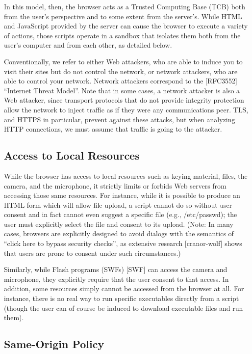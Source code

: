 \documentclass{article}
\begin{document}
In this model, then, the browser acts as a Trusted Computing Base
(TCB) both from the user's perspective and to some extent from the
server's.  While HTML and JavaScript provided by the server can cause
the browser to execute a variety of actions, those scripts operate in
a sandbox that isolates them both from the user's computer and from
each other, as detailed below.

Conventionally, we refer to either Web attackers, who are able to
induce you to visit their sites but do not control the network, or
network attackers, who are able to control your network.  Network
attackers correspond to the [RFC3552] ``Internet Threat Model''.  Note
that in some cases, a network attacker is also a Web attacker, since
transport protocols that do not provide integrity protection allow
the network to inject traffic as if they were any communications
peer.  TLS, and HTTPS in particular, prevent against these attacks,
but when analyzing HTTP connections, we must assume that traffic is
going to the attacker.

\subsection{Access to Local Resources}

While the browser has access to local resources such as keying
material, files, the camera, and the microphone, it strictly limits
or forbids Web servers from accessing those same resources.  For
instance, while it is possible to produce an HTML form which will
allow file upload, a script cannot do so without user consent and in
fact cannot even suggest a specific file (e.g., /etc/passwd); the
user must explicitly select the file and consent to its upload.
(Note: In many cases, browsers are explicitly designed to avoid
dialogs with the semantics of ``click here to bypass security checks'',
as extensive research [cranor-wolf] shows that users are prone to
consent under such circumstances.)

Similarly, while Flash programs (SWFs) [SWF] can access the camera
and microphone, they explicitly require that the user consent to that
access.  In addition, some resources simply cannot be accessed from
the browser at all.  For instance, there is no real way to run
specific executables directly from a script (though the user can of
course be induced to download executable files and run them).

\subsection{Same-Origin Policy}
\end{document}

